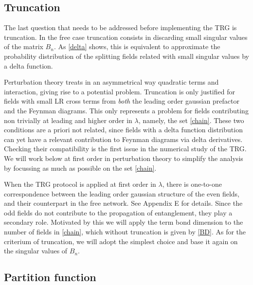 \documentclass[a4paper,preprintnumbers,nofootinbib,twocolumn]{quantumarticle}
\begin{document}
\vspace*{-1.mm}


\subsection{Truncation}

The last question that needs to be addressed before implementing the TRG is truncation.
In the free case truncation consists in discarding small singular values of the matrix $B_n$. 
As \eqref{delta} shows, this is equivalent to approximate the probability distribution of the splitting fields related with small singular values by a delta function.

Perturbation theory treats in an asymmetrical way quadratic terms and interaction, giving rise to a potential problem. Truncation is only justified 
for fields with small LR cross terms from {\it both} the leading order gaussian prefactor and the Feynman diagrams. 
This only represents a problem for fields contributing non trivially at leading and higher order in $\lambda$, namely, the set \eqref{chain}.
These two conditions are a priori not related, since fields with a delta function distribution can 
yet have a relevant contribution to Feynman diagrams via delta derivatives.
Checking their compatibility is the first issue in the numerical study of the TRG.
We will work below at first order in perturbation theory to simplify the analysis by focussing as much as possible on the set \eqref{chain}. 


When the TRG protocol is applied at first order in $\lambda$, there is one-to-one correspondence between the leading order gaussian structure of the even fields, and their counterpart in the
free network. See Appendix E for details.
Since the odd fields do not contribute to the propagation of entanglement, they play a secondary role. 
Motivated by this we will apply the term bond dimension to the number of fields in \eqref{chain}, which without truncation is given by \eqref{BD}. As for the criterium of truncation, 
we will adopt the simplest choice and base it again on the singular values of $B_n$.



\subsection{Partition function}
\end{document}
